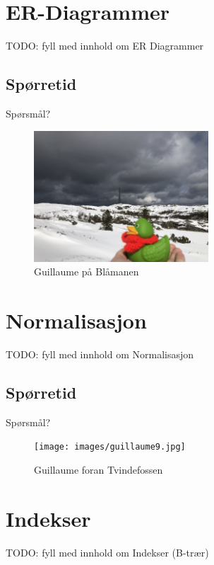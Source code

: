 \section{ER-Diagrammer}
\begin{frame}{}
    TODO: fyll med innhold om ER Diagrammer
\end{frame}

\subsection*{Spørretid}
\begin{frame}{Spørsmål?}
    \begin{figure}
        \centering
        \includegraphics[height = 4.9cm]{images/guillaume6.jpg}
        \caption{Guillaume på Blåmanen}
        \label{fig:guillaume6}
    \end{figure}
\end{frame}

\section{Normalisasjon}
\begin{frame}{}
    TODO: fyll med innhold om Normalisasjon
\end{frame}

\subsection*{Spørretid}
\begin{frame}{Spørsmål?}
    \begin{figure}
        \centering
        \texttt{[image: images/guillaume9.jpg]}
        \caption{Guillaume foran Tvindefossen}
        \label{fig:guillaume9}
    \end{figure}
\end{frame}


\section{Indekser}
\begin{frame}{}
    TODO: fyll med innhold om Indekser (B-trær)
\end{frame}

